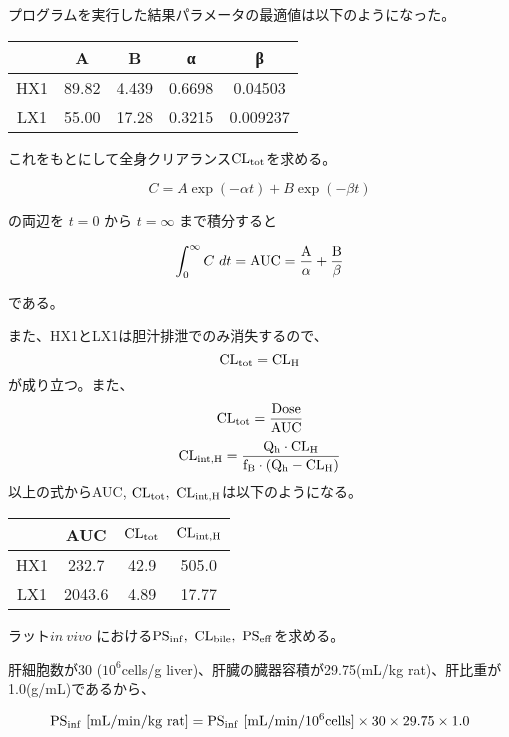 \documentclass[a4paper,papersize,dvipdfmx]{jsarticle}
\begin{document}
プログラムを実行した結果パラメータの最適値は以下のようになった。

\begin{table}[H]
\begin{center}
\begin{tabular}{|c|c|c|c|c|}
\hline
& A   & B    & α    & β           \\ \hline
HX1 & 89.82 & 4.439 & 0.6698  & 0.04503  \\ \hline
LX1 & 55.00   & 17.28 & 0.3215 & 0.009237 \\ \hline
\end{tabular}
\end{center}
\end{table}

これをもとにして全身クリアランス$\rm CL_{tot}$を求める。

\[C=A \exp(-\alpha t) + B \exp(- \beta t)\]

の両辺を $t=0$ から $t=\infty$ まで積分すると

\[\int_0^\infty C \ dt= \rm{AUC}=\frac{A}{\alpha}+\frac{B}{\beta}\]

である。

また、HX1とLX1は胆汁排泄でのみ消失するので、
\[\rm CL_{tot} = CL_H\]
が成り立つ。また、
\[\rm CL_{tot}=\frac{Dose}{AUC}\]
\[\rm CL_{int,H}=\frac{Q_h \cdot CL_H}{f_B \cdot (Q_h-CL_H)}\]
以上の式からAUC,$\ \rm CL_{tot}, \ CL_{int,H}$は以下のようになる。

\begin{table}[H]
\begin{center}
\begin{tabular}{|c|c|c|c|}
\hline
& AUC & $\rm CL_{tot}$     & $\rm CL_{int,H}$             \\ \hline
HX1 & 232.7 & 42.9 & 505.0 \\ \hline
LX1 & 2043.6 & 4.89 & 17.77 \\ \hline
\end{tabular}
\end{center}
\end{table}


\begin{tcolorbox}[colback=white,colbacktitle=black!10!white,coltitle=black,title={(3)}]
ラット$in \ vivo$ における$\rm PS_{inf}, \ CL_{bile}, \ PS_{eff}$を求める。
\end{tcolorbox}

肝細胞数が30 ($10^6$cells/g liver)、肝臓の臓器容積が29.75(mL/kg rat)、肝比重が1.0(g/mL)であるから、

\[\rm PS_{inf} \  [mL/min/kg \ rat]= PS_{inf} \ [mL/min/10^6 cells] \times 30 \times 29.75 \times 1.0\]
\end{document}
